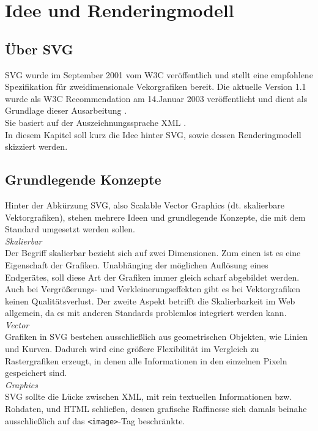 \section{Idee und Renderingmodell}
\subsection{Über SVG}
SVG wurde im September 2001 vom W3C veröffentlich und stellt eine empfohlene Spezifikation für zweidimensionale Vekorgrafiken bereit. Die aktuelle Version 1.1 wurde als W3C Recommendation am 14.Januar 2003 veröffentlicht und dient als Grundlage dieser Ausarbeitung \cite{svg:2003}.\\
Sie basiert auf der Auszeichnungssprache XML \cite{xml:2008}.\\
In diesem Kapitel soll kurz die Idee hinter SVG, sowie dessen Renderingmodell skizziert werden.

\subsection{Grundlegende Konzepte}
Hinter der Abkürzung SVG, also Scalable Vector Graphics (dt. skalierbare Vektorgrafiken), stehen mehrere Ideen und grundlegende Konzepte, die mit dem Standard umgesetzt werden sollen.\\

\textit{Skalierbar}\\
Der Begriff skalierbar bezieht sich auf zwei Dimensionen. Zum einen ist es eine Eigenschaft der Grafiken. Unabhänging der möglichen Auflösung eines Endgerätes, soll diese Art der Grafiken immer gleich scharf abgebildet werden. Auch bei Vergrößerungs- und Verkleinerungseffekten gibt es bei Vektorgrafiken keinen Qualitätsverlust.
Der zweite Aspekt betrifft die Skalierbarkeit im Web allgemein, da es mit anderen Standards problemlos integriert werden kann.\\

\emph{Vector}\\
Grafiken in SVG bestehen ausschließlich aus geometrischen Objekten, wie Linien und Kurven. Dadurch wird eine größere Flexibilität im Vergleich zu Rastergrafiken erzeugt, in denen alle Informationen in den einzelnen Pixeln gespeichert sind.\\

\emph{Graphics}\\
SVG sollte die Lücke zwischen XML, mit rein textuellen Informationen bzw. Rohdaten, und HTML schließen, dessen grafische Raffinesse sich damals beinahe ausschließlich auf das \texttt{<image>}-Tag beschränkte.

